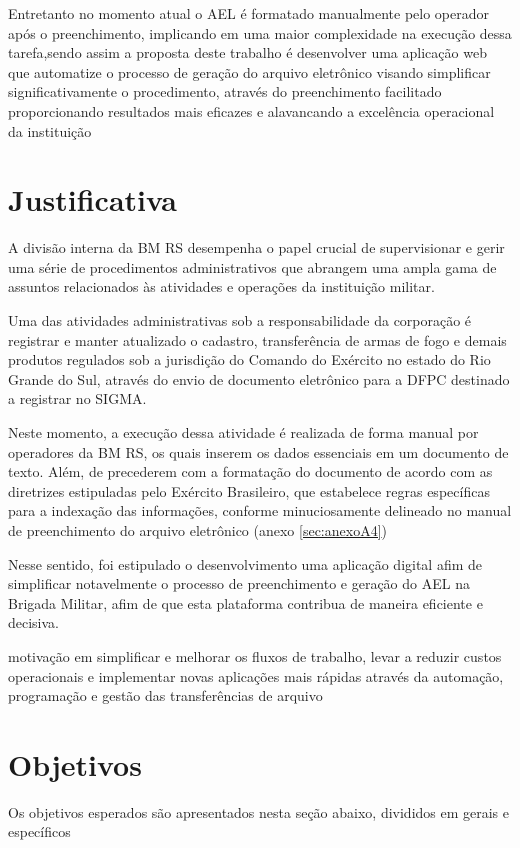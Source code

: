 Entretanto no momento atual o AEL é formatado manualmente pelo operador após o preenchimento, implicando em uma maior complexidade na execução dessa tarefa,sendo assim a proposta deste trabalho é desenvolver uma aplicação web que automatize o processo de geração do arquivo eletrônico visando simplificar significativamente o procedimento, através do preenchimento facilitado proporcionando resultados mais eficazes e alavancando a excelência operacional da instituição


\section{Justificativa}

A divisão interna da BM RS desempenha o papel crucial de supervisionar e gerir uma série de procedimentos administrativos que abrangem uma ampla gama de assuntos relacionados às atividades e operações da instituição militar. \cite{bmDepartamentoAdministrativo}

Uma das atividades administrativas sob a responsabilidade da corporação é registrar e manter atualizado o cadastro, transferência de armas de fogo e demais produtos regulados sob a jurisdição do Comando do Exército no estado do Rio Grande do Sul, através do envio de documento eletrônico para a DFPC destinado a registrar no SIGMA.\cite{ExércitoBrasileiro}

Neste momento, a execução dessa atividade é realizada de forma manual por operadores da BM RS, os quais inserem os dados essenciais em um documento de texto. Além, de precederem com a formatação do documento de acordo com as diretrizes estipuladas pelo Exército Brasileiro, que estabelece regras específicas para a indexação das informações, conforme minuciosamente delineado no manual de preenchimento do arquivo eletrônico (anexo \ref{sec:anexoA4})   

Nesse sentido, foi estipulado o desenvolvimento uma aplicação digital afim de simplificar notavelmente o processo de preenchimento e geração do AEL na Brigada Militar, afim de que esta plataforma contribua de maneira eficiente e decisiva.
\begin{citacao}
    motivação em simplificar e melhorar os fluxos de trabalho, levar a reduzir custos operacionais e implementar novas aplicações mais rápidas através da automação, programação e gestão das transferências de arquivo\cite{AndradeJunior}
    \end{citacao}

\section{Objetivos}
Os objetivos esperados são apresentados nesta seção abaixo, divididos em gerais e específicos 

